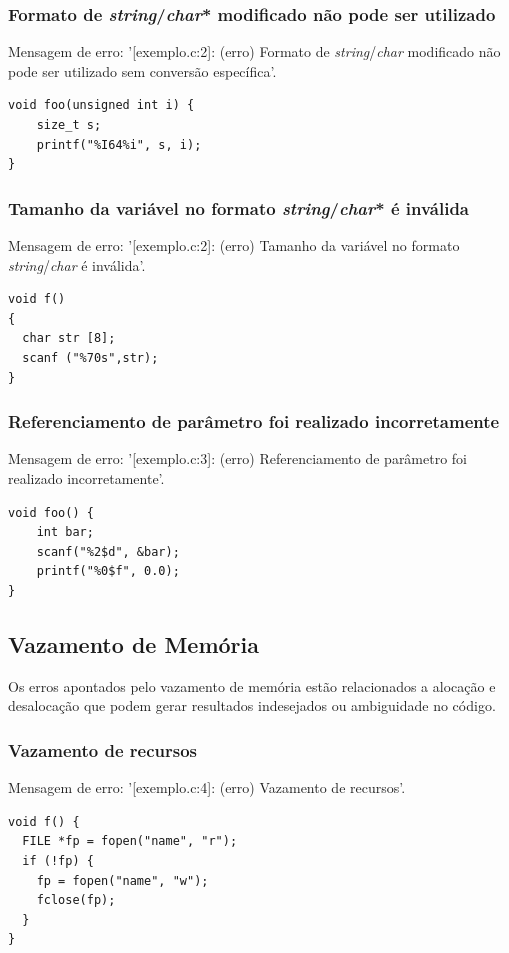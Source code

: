 \documentclass[12pt,a4paper]{report}
\begin{document}
\subsubsection{Formato de \textit{string}/\textit{char}* modificado não pode ser utilizado}
Mensagem de erro: '[exemplo.c:2]: (erro) Formato de \textit{string}/\textit{char} modificado não pode ser utilizado sem conversão específica'.
\begin{lstlisting}[style=CStyle]
void foo(unsigned int i) {
    size_t s;
    printf("%I64%i", s, i);
}
\end{lstlisting}

\subsubsection{Tamanho da variável no formato \textit{string}/\textit{char}* é inválida}
Mensagem de erro: '[exemplo.c:2]: (erro) Tamanho da variável no formato \textit{string}/\textit{char} é inválida'.
\begin{lstlisting}[style=CStyle]
void f()
{
  char str [8];
  scanf ("%70s",str);
}
\end{lstlisting}

\subsubsection{Referenciamento de parâmetro foi realizado incorretamente}
Mensagem de erro: '[exemplo.c:3]: (erro) Referenciamento de parâmetro foi realizado incorretamente'.
\begin{lstlisting}[style=CStyle]
void foo() {
    int bar;
    scanf("%2$d", &bar);
    printf("%0$f", 0.0);
}
\end{lstlisting}


\subsection{Vazamento de Memória}
Os erros apontados pelo vazamento de memória estão relacionados a alocação e desalocação que podem gerar resultados indesejados ou ambiguidade no código.

\subsubsection{Vazamento de recursos}
Mensagem de erro: '[exemplo.c:4]: (erro) Vazamento de recursos'.
\begin{lstlisting}[style=CStyle]
void f() {
  FILE *fp = fopen("name", "r");
  if (!fp) {
    fp = fopen("name", "w");
    fclose(fp);
  }
}
\end{lstlisting}
\end{document}
